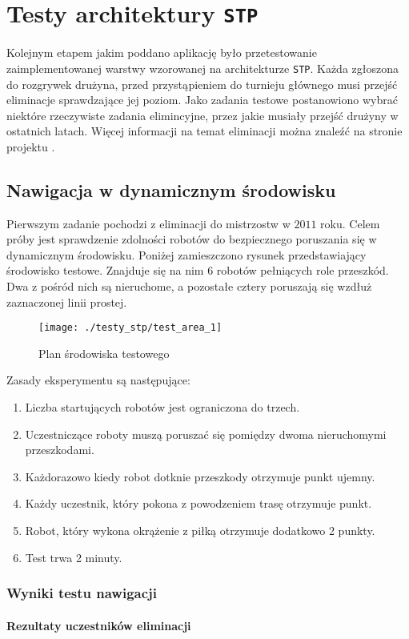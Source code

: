 \chapter{Testy architektury \texttt{STP} \label{chap:testy_stp}}
Kolejnym etapem jakim poddano aplikację było przetestowanie zaimplementowanej warstwy wzorowanej na architekturze \texttt{STP}.
Każda zgłoszona do rozgrywek drużyna, przed przystąpieniem do turnieju głównego musi przejść eliminacje sprawdzające jej poziom.
Jako zadania testowe postanowiono wybrać niektóre rzeczywiste zadania elimincyjne, przez jakie musiały przejść drużyny w ostatnich latach.
Więcej informacji na temat eliminacji można znaleźć na stronie projektu \cite{robocup}.
\section{ Nawigacja w dynamicznym środowisku \label{sec:2011}}
Pierwszym zadanie pochodzi z eliminacji do mistrzostw w $2011$ roku.
Celem próby jest sprawdzenie zdolności robotów do bezpiecznego poruszania się w dynamicznym środowisku. Poniżej zamieszczono rysunek przedstawiający 
środowisko testowe. Znajduje się na nim 6 robotów pełniących role przeszkód. Dwa z pośród nich są nieruchome, a pozostałe cztery poruszają się wzdłuż
zaznaczonej linii prostej.
\begin{figure}[!h]
\centering
\texttt{[image: ./testy\_stp/test\_area\_1]}
\caption{Plan środowiska testowego} \label{fig:arch}
\end{figure}
Zasady eksperymentu są następujące:
\begin{enumerate}
\item Liczba startujących robotów jest ograniczona do trzech.
\item Uczestniczące roboty muszą poruszać się pomiędzy dwoma nieruchomymi przeszkodami.
\item Każdorazowo kiedy robot dotknie przeszkody otrzymuje punkt ujemny.
\item Każdy uczestnik, który pokona z powodzeniem trasę otrzymuje punkt.
\item Robot, który wykona okrążenie z piłką otrzymuje dodatkowo 2 punkty.
\item Test trwa 2 minuty.
\end{enumerate}

\subsection{ Wyniki testu nawigacji }
\subsubsection{Rezultaty uczestników eliminacji}

